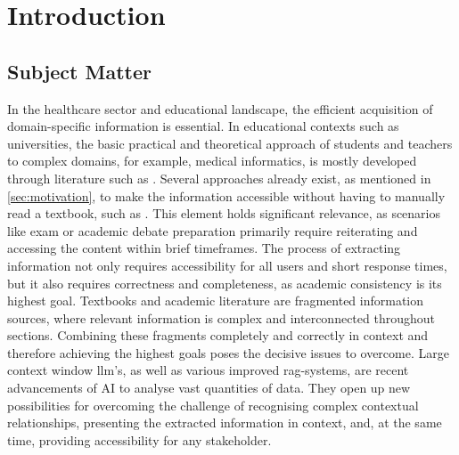 \chapter{Introduction}\label{ch:introduction}
\section{Subject Matter}\label{sec:subject matter}
In the healthcare sector and educational landscape, the efficient acquisition of domain-specific information is essential. 
In educational contexts such as universities, the basic practical and theoretical approach of students and teachers to complex domains, for example, medical informatics, is mostly developed through literature such as \citet{bb2}.
%
Several approaches already exist, as mentioned in \cref{sec:motivation}, to make the information accessible without having to manually read a textbook, such as \citet{bb2}.
This element holds significant relevance, as scenarios like exam or academic debate preparation primarily require reiterating and accessing the content within brief timeframes.
%
The process of extracting information not only requires accessibility for all users and short response times, but it also requires correctness and completeness, as academic consistency is its highest goal. 
Textbooks and academic literature are fragmented information sources, where relevant information is complex and interconnected throughout sections. 
Combining these fragments completely and correctly in context and therefore achieving the highest goals poses the decisive issues to overcome. 
%
Large context window \ac{llm}'s, as well as various improved \ac{rag}-systems, are recent advancements of AI to analyse vast quantities of data.
They open up new possibilities for overcoming the challenge of recognising complex contextual relationships, presenting the extracted information in context, and, at the same time, providing accessibility for any stakeholder.

